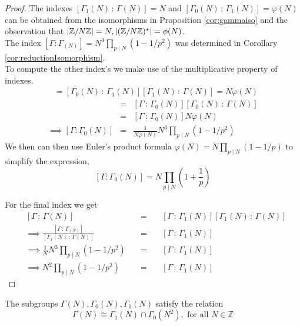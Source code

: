 \begin{proof}
The indexes $[\Gamma_1(N) \,:\, \Gamma(N) ] = N $ and $[\Gamma_0(N) \,:\, \Gamma_1(N) ] = \varphi(N)$ can be obtained from the isomorphisms in Proposition \ref{cor:gammaiso} and the observation that $\vert \mathbb{Z}/N\mathbb{Z} \vert = N, \vert (\mathbb{Z}/N\mathbb{Z} )^\star \vert = \phi(N)$.\\ 
The index $[\Gamma: \Gamma_(N)] =  N^3  \prod_{p\mid N}(1 - 1/p^2)$ was determined in Corollary \ref{cor:reductionIsomorphism}.\\
To compute the other index's we make use of the multiplicative property of indexes. \\
\begin{align*}
[\Gamma_0(N) \, : \, \Gamma(N)] & = [\Gamma_0(N) \, : \, \Gamma_1(N)][\Gamma_1(N) \, : \, \Gamma(N)] = N\varphi(N)
\end{align*} 
\begin{align*}
[\Gamma \, : \, \Gamma(N)] & = & [\Gamma  \,:\,  \Gamma_0(N)][\Gamma_0(N) \,:\, \Gamma(N)]\\
                           & = & [\Gamma  \,:\,  \Gamma_0(N)]N\varphi(N) \\
\implies   [\Gamma : \Gamma_0(N)]  & = &  \frac{1}{N\varphi(N)}N^3  \prod_{p\mid N}(1 - 1/p^2)
\end{align*}
We then can then use Euler's product formula $\varphi(N) = N \prod_{p\mid N}(1 - 1/p)$ to simplify the expression, 
$$[\Gamma: \Gamma_0(N)] = N \prod_{p\mid N}(1 + \frac{1}{p})$$

For the final index we get 
\begin{align*}
&[\Gamma \,:\,  \Gamma(N)] & \quad = \quad & [\Gamma \,:\,  \Gamma_1(N)][\Gamma_1(N) \,:\,  \Gamma(N)]  \\
&\implies \frac{[\Gamma \,:\,  \Gamma_(N)]}{[\Gamma_1(N) \,:\,  \Gamma(N)] } & \quad = \quad &   [\Gamma \,:\,  \Gamma_1(N)]\\
&\implies      \frac{1}{N} N^3  \prod_{p\mid N}(1 - 1/p^2)            & \quad = \quad &  [\Gamma \,:\,  \Gamma_1(N)]\\
& \implies                           N^2 \prod_{p\mid N}(1 - 1/p^2)   & \quad = \quad &  [\Gamma \,:\,  \Gamma_1(N)]
\end{align*}
\end{proof}

\begin{proposition}\label{prop:gammaisoIntersection}
The subgroups $\Gamma(N), \Gamma_0(N), \Gamma_1(N)$ satisfy the relation
$$\Gamma(N) \cong \Gamma_1(N) \cap \Gamma_0(N^2), \text{ for all } N \in \mathbb{Z}$$
\end{proposition}

